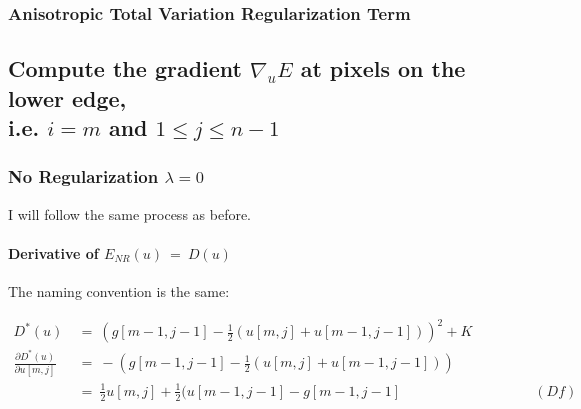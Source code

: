 \documentclass{report}
\begin{document}
			\subsubsection{Anisotropic Total Variation Regularization Term}
			\startsubsection
			\closesection
		\closesection
		
		\subsection{Compute the gradient $\nabla_u E$ at pixels on the lower edge, \\ i.e. $i = m$ and $1 \leq j \leq n-1$}
		\startsubsection
			\subsubsection{No Regularization $\lambda = 0$}
			\startsubsection
				I will follow the same process as before.
				\vspace{-0.4cm} \paragraph{Derivative of  $E_{NR}(u) \ = \ D(u)$}
				\startsubsection
					The naming convention is the same:
				\closesection
				\begin{adjustwidth}{-7em}{}
					\vspace{-0.6cm}
					\begin{align*}
						D^*(u) \ & = \ (g[m-1,j-1] - \frac{1}{2} (u[m,j] + u[m-1,j-1]))^2 + K \\
						\frac{\partial D^*(u)}{\partial u[m,j]} \ & = \ - (g[m-1,j-1] - \frac{1}{2} (u[m,j] + u[m-1,j-1])) \\
						& = \ \frac{1}{2} u[m,j]  + \frac{1}{2} (u[m-1,j-1] - g[m-1,j-1] \hspace{4cm} (Df)
					\end{align*}
				\end{adjustwidth}
			\closesection
\end{document}
